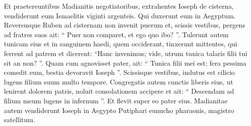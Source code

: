 \begin{biblechapter}
\begin{biblechapter}
\begin{biblechapter}
\begin{biblechapter}
\begin{biblechapter}
\begin{biblechapter}
\begin{biblechapter}
\begin{biblechapter}
\begin{biblechapter}
\begin{biblechapter}
\begin{biblechapter}
\begin{biblechapter}
\begin{biblechapter}
\begin{biblechapter}
\begin{biblechapter}
\begin{biblechapter}
\begin{biblechapter}
\begin{biblechapter}
\begin{biblechapter}
\begin{biblechapter}
\begin{biblechapter}
\begin{biblechapter}
\begin{biblechapter}
\begin{biblechapter}
\begin{biblechapter}
\begin{biblechapter}
\begin{biblechapter}
\begin{biblechapter}
\begin{biblechapter}
\begin{biblechapter}
\begin{biblechapter}
\begin{biblechapter}
\begin{biblechapter}
\begin{biblechapter}
\begin{biblechapter}
\begin{biblechapter}
\begin{biblechapter}
\verse Et praetereuntibus Madianitis negotiatoribus, extrahentes Ioseph de cisterna, vendiderunt eum Ismaelitis viginti argenteis. Qui duxerunt eum in Aegyptum.
 \verse Reversusque Ruben ad cisternam non invenit puerum 
\verse et, scissis vestibus, pergens ad fratres suos ait: “ Puer non comparet, et ego quo ibo? ”. 
 \verse Tulerunt autem tunicam eius et in sanguinem haedi, quem occiderant, tinxerunt 
 \verse mittentes, qui ferrent ad patrem et dicerent: “Hanc invenimus; vide, utrum tunica talaris filii tui sit an non? ”.
 \verse Quam cum agnovisset pater, ait: “ Tunica filii mei est; fera pessima comedit eum, bestia devoravit Ioseph ”. 
\verse Scissisque vestibus, indutus est cilicio lugens filium suum multo tempore. 
\verse Congregatis autem cunctis liberis eius, ut lenirent dolorem patris, noluit consolationem accipere et ait: “ Descendam ad filium meum lugens in infernum ”. Et flevit super eo pater eius.
 \verse Madianitae autem vendiderunt Ioseph in Aegypto Putiphari eunucho pharaonis, magistro satellitum.
 

\end{biblechapter}
\end{biblechapter}
\end{biblechapter}
\end{biblechapter}
\end{biblechapter}
\end{biblechapter}
\end{biblechapter}
\end{biblechapter}
\end{biblechapter}
\end{biblechapter}
\end{biblechapter}
\end{biblechapter}
\end{biblechapter}
\end{biblechapter}
\end{biblechapter}
\end{biblechapter}
\end{biblechapter}
\end{biblechapter}
\end{biblechapter}
\end{biblechapter}
\end{biblechapter}
\end{biblechapter}
\end{biblechapter}
\end{biblechapter}
\end{biblechapter}
\end{biblechapter}
\end{biblechapter}
\end{biblechapter}
\end{biblechapter}
\end{biblechapter}
\end{biblechapter}
\end{biblechapter}
\end{biblechapter}
\end{biblechapter}
\end{biblechapter}
\end{biblechapter}
\end{biblechapter}
